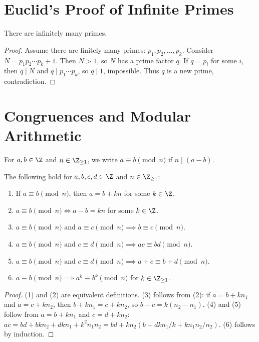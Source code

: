 \section{Euclid's Proof of Infinite Primes}
\label{sec:euclid-primes}

\begin{theorem}
\label{thm:euclid-primes}
There are infinitely many primes.
\end{theorem}

\begin{proof}
Assume there are finitely many primes: $p_1, p_2, \ldots, p_k$. Consider $N = p_1 p_2 \cdots p_k + 1$. Then $N > 1$, so $N$ has a prime factor $q$. If $q = p_i$ for some $i$, then $q \mid N$ and $q \mid p_1 \cdots p_k$, so $q \mid 1$, impossible. Thus $q$ is a new prime, contradiction.
\end{proof}

\section{Congruences and Modular Arithmetic}
\label{sec:congruences}

For $a, b \in \Z$ and $n \in \Z_{\geq 1}$, we write $a \equiv b \pmod n$ if $n \mid (a - b)$.

\begin{theorem}
\label{thm:congruence-properties}
The following hold for $a, b, c, d \in \Z$ and $n \in \Z_{\geq 1}$:
\begin{enumerate}
\item If $a \equiv b \pmod n$, then $a = b + kn$ for some $k \in \Z$.
\item $a \equiv b \pmod n \iff a - b = kn$ for some $k \in \Z$.
\item $a \equiv b \pmod n \text{ and } a \equiv c \pmod n \implies b \equiv c \pmod n$.
\item $a \equiv b \pmod n \text{ and } c \equiv d \pmod n \implies ac \equiv bd \pmod n$.
\item $a \equiv b \pmod n \text{ and } c \equiv d \pmod n \implies a + c \equiv b + d \pmod n$.
\item $a \equiv b \pmod n \implies a^k \equiv b^k \pmod n$ for $k \in \Z_{\geq 1}$.
\end{enumerate}
\end{theorem}

\begin{proof}
(1) and (2) are equivalent definitions. (3) follows from (2): if $a = b + kn_1$ and $a = c + kn_2$, then $b + kn_1 = c + kn_2$, so $b - c = k(n_2 - n_1)$. (4) and (5) follow from $a = b + kn_1$ and $c = d + kn_2$: $ac = bd + bkn_2 + dkn_1 + k^2n_1n_2 = bd + kn_2(b + dkn_1/k + kn_1n_2/n_2)$. (6) follows by induction.
\end{proof}

